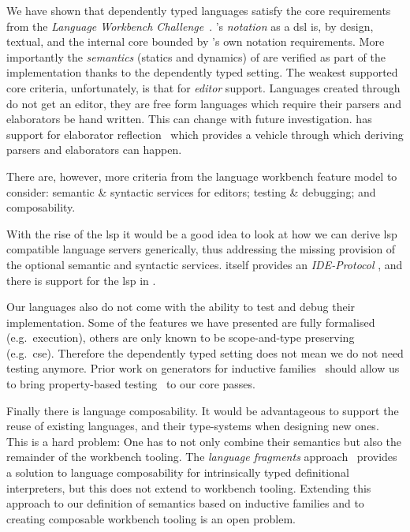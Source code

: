 We have shown that dependently typed languages satisfy the core requirements from the \emph{Language Workbench Challenge}~\cite{DBLP:conf/sle/ErdwegSVBBCGHKLKMPPSSSVVVWW13}.
%
\Velo{}'s \emph{notation} as a \ac{dsl} is, by design, textual, and the internal core bounded by \Idris{}'s own notation requirements.
%
More importantly the \emph{semantics} (statics and dynamics) of \Velo{}
are verified as part of the implementation thanks to the dependently typed setting.
%
The weakest supported core criteria, unfortunately, is that for \emph{editor} support.
%
Languages created through \Idris{} do not get an editor, they are free form languages which require their parsers and elaborators be hand written.
This can change with future investigation.
\Idris{} has support for elaborator reflection~\cite{DBLP:conf/icfp/ChristiansenB16} which provides a vehicle through which deriving parsers and elaborators can happen.


There are, however, more criteria from the language workbench feature model to consider:
%
semantic \& syntactic services for editors;
%
testing \& debugging;
%
and
%
composability.
%

With the rise of the \ac{lsp} it would be a good idea to look at how we can derive \ac{lsp} compatible language servers generically, thus addressing the missing provision of the optional semantic and syntactic services.
\Idris{} itself provides an \emph{IDE-Protocol}
, and there is support for the \ac{lsp} in \Idris{}.

Our languages also do not come with the ability to test and debug their
implementation.
%
Some of the features we have presented are fully formalised (e.g.\ execution),
others are only known to be scope-and-type preserving (e.g.\ \ac{cse}).
%
Therefore the dependently typed setting does not mean we do not need testing
anymore.
%
Prior work on generators for inductive families~\cite{DBLP:journals/pacmpl/LampropoulosPP18}
should allow us to bring property-based testing~\cite{DBLP:conf/icfp/ClaessenH00} to our core passes.


Finally there is language composability.
%
%
It would be advantageous to support the reuse of existing languages,
and their type-systems when designing new ones.
%
This is a hard problem:
%
One has to not only combine their semantics but also the remainder of the workbench tooling.
%
The \emph{language fragments} approach~\cite{10.1145/3563355} provides a
solution to language composability for intrinsically typed definitional
interpreters, but this does not extend to workbench tooling.
%
Extending this approach to our definition of semantics based on inductive
families and to creating composable workbench tooling is an open problem.


